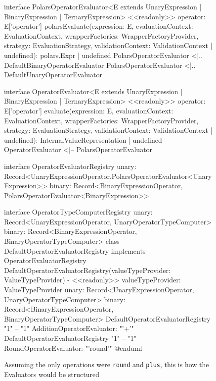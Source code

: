 \begin{figure}
\begin{plantuml}
		interface PolarsOperatorEvaluator<E extends UnaryExpression | BinaryExpression | TernaryExpression> {
				<<readonly>> operator: E['operator']
				polarsEvaluate(expression: E, evaluationContext: EvaluationContext, wrapperFactories: WrapperFactoryProvider, strategy: EvaluationStrategy, validationContext: ValidationContext | undefined): polars.Expr | undefined
			}
		PolarsOperatorEvaluator <|.. DefaultBinaryOperatorEvaluator
		PolarsOperatorEvaluator <|.. DefaultUnaryOperatorEvaluator

		interface OperatorEvaluator<E extends UnaryExpression | BinaryExpression | TernaryExpression> {
				<<readonly>> operator: E['operator']
				evaluate(expression: E, evaluationContext: EvaluationContext, wrapperFactories: WrapperFactoryProvider, strategy: EvaluationStrategy, validationContext: ValidationContext | undefined): InternalValueRepresentation | undefined
			}
		OperatorEvaluator <|-- PolarsOperatorEvaluator

		interface OperatorEvaluatorRegistry {
				unary: Record<UnaryExpressionOperator,PolarsOperatorEvaluator<UnaryExpression>>
				binary: Record<BinaryExpressionOperator, PolarsOperatorEvaluator<BinaryExpression>>
			}

		interface OperatorTypeComputerRegistry {
				unary: Record<UnaryExpressionOperator, UnaryOperatorTypeComputer>
				binary: Record<BinaryExpressionOperator, BinaryOperatorTypeComputer>
			}
		class DefaultOperatorEvaluatorRegistry implements OperatorEvaluatorRegistry {
				DefaultOperatorEvaluatorRegistry(valueTypeProvider: ValueTypeProvider)
				- <<readonly>> valueTypeProvider: ValueTypeProvider
				unary: Record<UnaryExpressionOperator, UnaryOperatorTypeComputer>
				binary: Record<BinaryExpressionOperator, BinaryOperatorTypeComputer>
			}
		DefaultOperatorEvaluatorRegistry "1" -- "1" AdditionOperatorEvaluator: "'+'"
		DefaultOperatorEvaluatorRegistry "1" -- "1" RoundOperatorEvaluator: "'round'"
		@enduml
	\end{plantuml}
	\caption{Assuming the only operations were \Verb|round| and \Verb|plus|, this is how the Evaluators would be structured}
	\label{fig:evaluators_class_diagram}
\end{figure}



